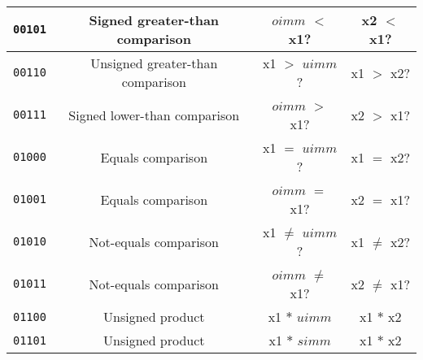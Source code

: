 \begin{center}
\begin{longtable}{|c|c|c|c|}
    \texttt{00101}                       &
    Signed greater-than comparison       &
    $oimm$ $<$ x1?                       &
    x2 $<$ x1?                           \\ \hline

    \texttt{00110}                       &
    Unsigned greater-than comparison     &
    x1 $>$ $uimm$?                       &
    x1 $>$ x2?                           \\ \hline

    \texttt{00111}                       &
    Signed lower-than comparison         &
    $oimm$ $>$ x1?                       &
    x2 $>$ x1?                           \\ \hline

    \texttt{01000}                       &
    Equals comparison                    &
    x1 $=$ $uimm$?                       &
    x1 $=$ x2?                           \\ \hline

    \texttt{01001}                       &
    Equals comparison                    &
    $oimm$ $=$ x1?                       &
    x2 $=$ x1?                           \\ \hline

    \texttt{01010}                       &
    Not-equals comparison                &
    x1 $\ne$ $uimm$?                     &
    x1 $\ne$ x2?                         \\ \hline

    \texttt{01011}                       &
    Not-equals comparison                &
    $oimm$ $\ne$ x1?                     &
    x2 $\ne$ x1?                         \\ \hline

      \texttt{01100}                       &
      Unsigned product                     &
      x1 $*$ $uimm$                        &
      x1 $*$ x2                            \\ \hline
                                           
      \texttt{01101}                       &
      Unsigned product                     &
      x1 $*$ $simm$                        &
      x1 $*$ x2                            \\ \hline
                                           

\end{longtable}
\end{center}
